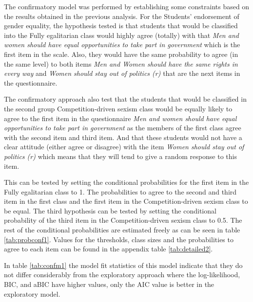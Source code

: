 \documentclass[12pt,a4paper,oneside]{reedthesis}
\begin{document}
The confirmatory model was performed by establishing some constraints based on the results obtained in the previous analysis. For the Students' endorsement of gender equality, the hypothesis tested is that students that would be classified into the Fully egalitarian class would highly agree (totally) with that \emph{Men and women should have equal opportunities to take part in government} which is the first item in the scale. Also, they would have the same probability to agree (in the same level) to both items \emph{Men and Women should have the same rights in every way} and \emph{Women should stay out of politics (r)} that are the next items in the questionnaire.

The confirmatory approach also test that the students that would be classified in the second group Competition-driven sexism class would be equally likely to agree to the first item in the questionnaire \emph{Men and women should have equal opportunities to take part in government} as the members of the first class agree with the second item and third item. And that these students would not have a clear attitude (either agree or disagree) with the item \emph{Women should stay out of politics (r)} which means that they will tend to give a random response to this item.

This can be tested by setting the conditional probabilities for the first item in the Fully egalitarian class to 1. The probabilities to agree to the second and third item in the first class and the first item in the Competition-driven sexism class to be equal. The third hypothesis can be tested by setting the conditional probability of the third item in the Competition-driven sexism class to 0.5. The rest of the conditional probabilities are estimated freely as can be seen in table \ref{tab:probconf1}. Values for the thresholds, class sizes and the probabilities to agree to each item can be found in the appendix table \ref{tab:detailed2}.

In table \ref{tab:confm1} the model fit statistics of this model indicate that they do not differ considerably from the exploratory approach where the log-likelihood, BIC, and aBIC have higher values, only the AIC value is better in the exploratory model.
\end{document}
